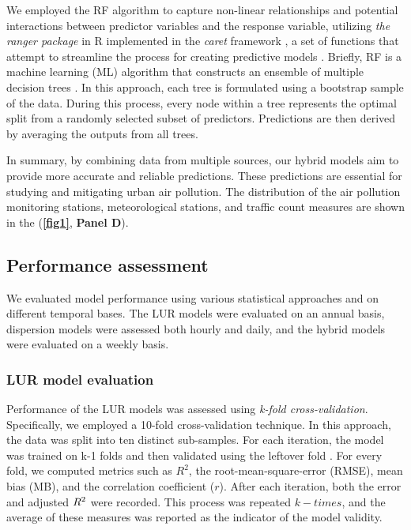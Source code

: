 \documentclass{article}
\begin{document}
We employed the RF algorithm to capture non-linear relationships and potential interactions between predictor variables and the response variable, utilizing \textit{the ranger package} in R implemented in the \textit{caret} framework \cite{wright2019}, a set of functions that attempt to streamline the process for creating predictive models \cite{caret2008}. Briefly, RF is a machine learning (ML) algorithm that constructs an ensemble of multiple decision trees \cite{breiman2001}. In this approach, each tree is formulated using a bootstrap sample of the data. During this process, every node within a tree represents the optimal split from a randomly selected subset of predictors. Predictions are then derived by averaging the outputs from all trees.

In summary, by combining data from multiple sources, our hybrid models aim to provide more accurate and reliable predictions. These predictions are essential for studying and mitigating urban air pollution. The distribution of the air pollution monitoring stations, meteorological stations, and traffic count measures are shown in the (\textbf{\cref{fig1}}, \textbf{Panel D}). 

\subsection{Performance assessment}

We evaluated model performance using various statistical approaches and on different temporal bases. The LUR models were evaluated on an annual basis, dispersion models were assessed both hourly and daily, and the hybrid models were evaluated on a weekly basis.

\subsubsection{LUR model evaluation}
Performance of the LUR models was assessed using \textit{k-fold cross-validation}. Specifically, we employed a 10-fold cross-validation technique. In this approach, the data was split into ten distinct sub-samples. For each iteration, the model was trained on k-1 folds and then validated using the leftover fold \cite{ziegel2003}. For every fold, we computed metrics such as \(R^2\), the root-mean-square-error (RMSE), mean bias (MB), and the correlation coefficient (\(r\)). After each iteration, both the error and adjusted \(R\textsuperscript{2}\) were recorded. This process was repeated \(k-times\), and the average of these measures was reported as the indicator of the model validity. 
\vspace{0.5cm} 
\end{document}
